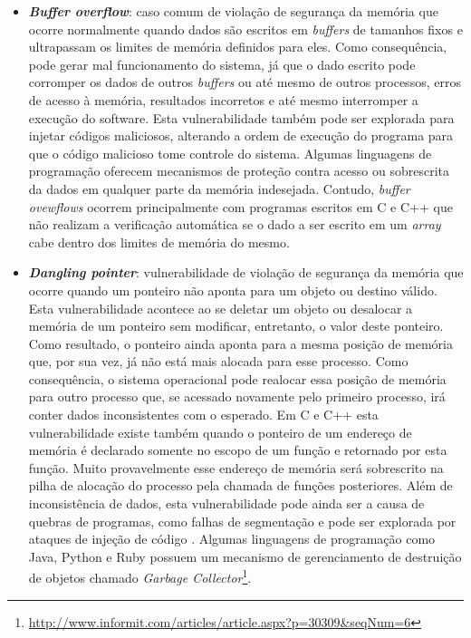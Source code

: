 \begin{itemize}
\item \textbf{\emph{Buffer overflow}}: caso comum de violação de segurança da memória que ocorre normalmente quando dados são escritos em \emph{buffers} de tamanhos fixos e ultrapassam os limites de memória definidos para eles. Como consequência, pode gerar mal funcionamento do sistema, já que o dado escrito pode corromper os dados de outros \emph{buffers} ou até mesmo de outros processos, erros de acesso à memória, resultados incorretos e até mesmo interromper a execução do software. Esta vulnerabilidade também pode ser explorada para injetar códigos maliciosos, alterando a ordem de execução do programa para que o código malicioso tome controle do sistema. Algumas linguagens de programação oferecem mecanismos de proteção contra acesso ou sobrescrita da dados em qualquer parte da memória indesejada. Contudo, \emph{buffer ovewflows} ocorrem principalmente com programas escritos em C e C++ que não realizam a verificação automática se o dado a ser escrito em um \emph{array} cabe dentro dos limites de memória do mesmo.

\item \textbf{\emph{Dangling pointer}}: vulnerabilidade de violação de segurança da memória que ocorre quando um ponteiro não aponta para um objeto ou destino válido. Esta vulnerabilidade acontece ao se deletar um objeto ou desalocar a memória de um ponteiro sem modificar, entretanto, o valor deste ponteiro. Como resultado, o ponteiro ainda aponta para a mesma posição de memória que, por sua vez, já não está mais alocada para esse processo. Como consequência, o sistema operacional pode realocar essa posição de memória para outro processo que, se acessado novamente pelo primeiro processo, irá conter dados inconsistentes com o esperado. Em C e C++ esta vulnerabilidade existe também quando o ponteiro de um endereço de memória é declarado somente no escopo de um função e retornado por esta função. Muito provavelmente esse endereço de memória será sobrescrito na pilha de alocação do processo pela chamada de funções posteriores. Além de inconsistência de dados, esta vulnerabilidade pode ainda ser a causa de quebras de programas, como falhas de segmentação e pode ser explorada por ataques de injeção de código \cite{afek2007}. Algumas linguagens de programação como Java, Python e Ruby possuem um mecanismo de gerenciamento de destruição de objetos chamado \emph{Garbage Collector}\footnote{\url{http://www.informit.com/articles/article.aspx?p=30309&seqNum=6}}.


\end{itemize}
